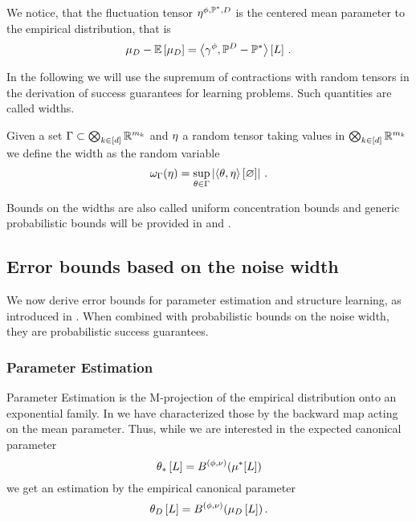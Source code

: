 We notice, that the fluctuation tensor $\eta^{\phi,\mathbb{P}^*,D}$ is the centered mean parameter to the empirical distribution, that is
\begin{align*}
    \mu_{D} - \mathbb{E}\left[\mu_{D}\right] =  \left\langle \gamma^{\phi},\mathbb{P}^{D}-\mathbb{P}^*\right\rangle \left[ L \right] \, .
\end{align*}


In the following we will use the supremum of contractions with random tensors in the derivation of success guarantees for learning problems.
Such quantities are called widths.

\begin{definition}
    Given a set $\Gamma\subset\bigotimes_{k\in[d]} \mathbb{R}^{m_{k}}$ and $\eta$ a random tensor taking values in $\bigotimes_{k\in[d]} \mathbb{R}^{m_{k}}$ we define the width as the random variable
    \[ \omega_{\Gamma}(\eta) = \sup_{\theta\in\Gamma} \left|\left\langle \theta,\eta\right\rangle \left[ \varnothing \right]\right| \, . \]
\end{definition}

Bounds on the widths are also called uniform concentration bounds \cite{goessmann_uniform_2021} and generic probabilistic bounds will be provided in  and  .

\subsection{Error bounds based on the noise width}

We now derive error bounds for parameter estimation and structure learning, as introduced in .
When combined with probabilistic bounds on the noise width, they are probabilistic success guarantees.

\subsubsection{Parameter Estimation}

Parameter Estimation is the M-projection of the empirical distribution onto an exponential family.
In  we have characterized those by the backward map acting on the mean parameter.
Thus, while we are interested in the expected canonical parameter
\[
    \theta_{*}\left[L\right] = B^{(\phi,\nu)}(\mu^*[L])
\]
we get an estimation by the empirical canonical parameter
\[
    \theta_{D}\left[L\right]  = B^{(\phi,\nu)}(\mu_{D}\left[L\right]) \, .
\]

